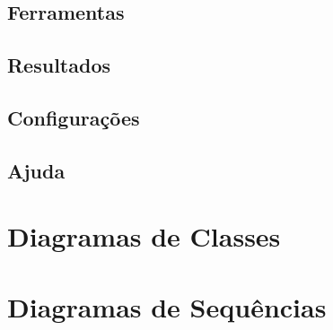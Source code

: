 \subsection{Ferramentas}
\subsection{Resultados}
\subsection{Configurações}
\subsection{Ajuda}

\section{Diagramas de Classes}

\section{Diagramas de Sequências}

